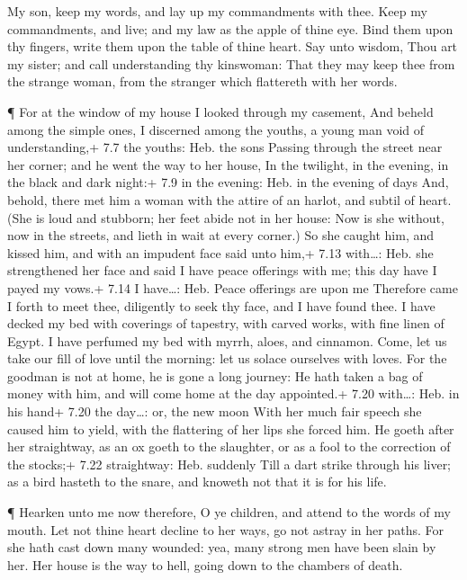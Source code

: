  My son, keep my words, and lay up my commandments with
thee.  Keep my commandments, and live; and my law as the
apple of thine eye.  Bind them upon thy fingers, write them
upon the table of thine heart.  Say unto wisdom, Thou art my
sister; and call understanding thy kinswoman:  That they may
keep thee from the strange woman, from the stranger which flattereth
with her words.

 ¶ For at the window of my house I looked through my
casement,  And beheld among the simple ones, I discerned
among the youths, a young man void of understanding,+ 7.7 the youths:
Heb. the sons  Passing through the street near her corner;
and he went the way to her house,  In the twilight, in the
evening, in the black and dark night:+ 7.9 in the evening: Heb. in the
evening of days  And, behold, there met him a woman with
the attire of an harlot, and subtil of heart.  (She is loud
and stubborn; her feet abide not in her house:  Now is she
without, now in the streets, and lieth in wait at every corner.)
 So she caught him, and kissed him, and with an impudent
face said unto him,+ 7.13 with\ldots: Heb. she strengthened her face and
said  I have peace offerings with me; this day have I payed
my vows.+ 7.14 I have\ldots: Heb. Peace offerings are upon me
 Therefore came I forth to meet thee, diligently to seek
thy face, and I have found thee.  I have decked my bed with
coverings of tapestry, with carved works, with fine linen of Egypt.
 I have perfumed my bed with myrrh, aloes, and cinnamon.
 Come, let us take our fill of love until the morning: let
us solace ourselves with loves.  For the goodman is not at
home, he is gone a long journey:  He hath taken a bag of
money with him, and will come home at the day appointed.+ 7.20
with\ldots: Heb. in his hand+ 7.20 the day\ldots: or, the new moon
 With her much fair speech she caused him to yield, with
the flattering of her lips she forced him.  He goeth after
her straightway, as an ox goeth to the slaughter, or as a fool to the
correction of the stocks;+ 7.22 straightway: Heb. suddenly 
Till a dart strike through his liver; as a bird hasteth to the snare,
and knoweth not that it is for his life.

 ¶ Hearken unto me now therefore, O ye children, and attend
to the words of my mouth.  Let not thine heart decline to
her ways, go not astray in her paths.  For she hath cast
down many wounded: yea, many strong men have been slain by her.
 Her house is the way to hell, going down to the chambers
of death.

